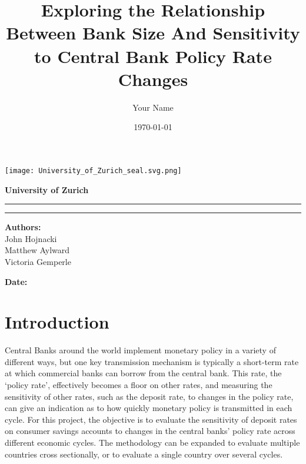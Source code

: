 \documentclass{article}
\title{\textbf{Exploring the Relationship Between Bank Size And Sensitivity to Central Bank Policy Rate Changes}}
\author{Your Name}
\date{\today}
\begin{document}
\begin{titlepage}
    \centering
    \vspace*{-1cm} %
    \centering
    \texttt{[image: University\_of\_Zurich\_seal.svg.png]} %
    \vspace{2cm}
    
    {\LARGE\textbf{University of Zurich}}
    \vspace{1cm}
    
    \hrule
    \vspace{0.5cm}
    
    {\huge\thetitle}
    \vspace{0.5cm}
    
    \hrule
    \vspace{1cm}
    
    \textbf{Authors:}\\ John Hojnacki \\ Matthew Aylward \\ Victoria Gemperle
    \vspace{1cm}
    
    \textbf{Date:}\\
    \thedate
    \vfill

    
\end{titlepage}

\section{Introduction}

    \linespread{1}  %
    
Central Banks around the world implement monetary policy in a variety of different ways, but one key transmission mechanism is typically a short-term rate at which commercial banks can borrow from the central bank. This rate, the ‘policy rate’, effectively becomes a floor on other rates, and measuring the sensitivity of other rates, such as the deposit rate, to changes in the policy rate, can give an indication as to how quickly monetary policy is transmitted in each cycle. For this project, the objective is to evaluate the sensitivity of deposit rates on consumer savings accounts to changes in the central banks’ policy rate across different economic cycles. The methodology can be expanded to evaluate multiple countries cross sectionally, or to evaluate a single country over several cycles.
\end{document}
